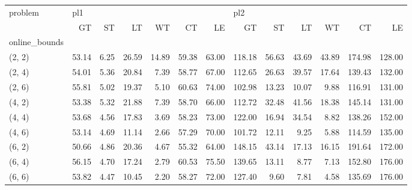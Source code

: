 \begin{tabular}{lrrrrrrrrrrrr}
\toprule
problem & \multicolumn{6}{l}{pl1} & \multicolumn{6}{l}{pl2} \\
{} &    GT &   ST &    LT &    WT &    CT &    LE &     GT &    ST &    LT &    WT &     CT &     LE \\
online\_bounds &       &      &       &       &       &       &        &       &       &       &        &        \\
\midrule
(2, 2)        & 53.14 & 6.25 & 26.59 & 14.89 & 59.38 & 63.00 & 118.18 & 56.63 & 43.69 & 43.89 & 174.98 & 128.00 \\
(2, 4)        & 54.01 & 5.36 & 20.84 &  7.39 & 58.77 & 67.00 & 112.65 & 26.63 & 39.57 & 17.64 & 139.43 & 132.00 \\
(2, 6)        & 55.81 & 5.02 & 19.37 &  5.10 & 60.63 & 74.00 & 102.98 & 13.23 & 10.07 &  9.88 & 116.91 & 131.00 \\
(4, 2)        & 53.38 & 5.32 & 21.88 &  7.39 & 58.70 & 66.00 & 112.72 & 32.48 & 41.56 & 18.38 & 145.14 & 131.00 \\
(4, 4)        & 53.68 & 4.56 & 17.83 &  3.69 & 58.23 & 73.00 & 122.00 & 16.94 & 34.54 &  8.82 & 138.26 & 152.00 \\
(4, 6)        & 53.14 & 4.69 & 11.14 &  2.66 & 57.29 & 70.00 & 101.72 & 12.11 &  9.25 &  5.88 & 114.59 & 135.00 \\
(6, 2)        & 50.66 & 4.86 & 20.36 &  4.67 & 55.32 & 64.00 & 148.15 & 43.14 & 17.13 & 16.15 & 191.64 & 172.00 \\
(6, 4)        & 56.15 & 4.70 & 17.24 &  2.79 & 60.53 & 75.50 & 139.65 & 13.11 &  8.77 &  7.13 & 152.80 & 176.00 \\
(6, 6)        & 53.82 & 4.47 & 10.45 &  2.20 & 58.27 & 72.00 & 127.40 &  9.60 &  7.81 &  4.58 & 135.69 & 176.00 \\
\bottomrule
\end{tabular}
